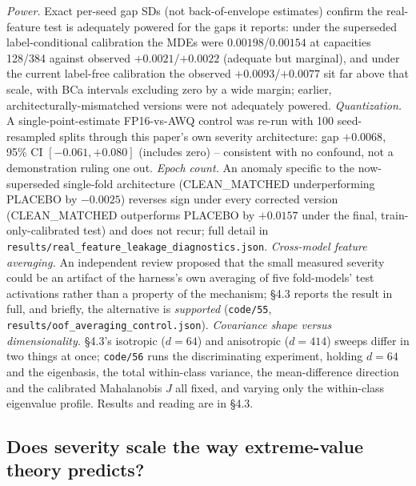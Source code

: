 \documentclass[10pt]{article} %
\begin{document}
\emph{Power.} Exact
per-seed gap SDs (not back-of-envelope estimates) confirm the real-feature
test is adequately powered for the gaps it reports: under the superseded
label-conditional calibration the MDEs were $0.00198$/$0.00154$ at capacities
128/384 against observed $+0.0021$/$+0.0022$ (adequate but marginal), and
under the current label-free calibration the observed $+0.0093$/$+0.0077$ sit
far above that scale, with BCa intervals excluding zero by a wide margin;
earlier, architecturally-mismatched versions were not adequately powered.
\emph{Quantization.} A single-point-estimate FP16-vs-AWQ control was re-run
with 100 seed-resampled splits through this paper's own severity
architecture: gap $+0.0068$, 95\% CI $[-0.061,+0.080]$ (includes zero) --
consistent with no confound, not a demonstration ruling one out. \emph{Epoch
count.} An anomaly specific to the now-superseded single-fold architecture
(CLEAN\_MATCHED underperforming PLACEBO by $-0.0025$) reverses sign under
every corrected version (CLEAN\_MATCHED outperforms PLACEBO by $+0.0157$
under the final, train-only-calibrated test) and does not recur; full detail
in \texttt{results/real\_feature\_leakage\_diagnostics.json}.
\emph{Cross-model feature averaging.} An independent review proposed that the
small measured severity could be an artifact of the harness's own averaging
of five fold-models' test activations rather than a property of the
mechanism; §4.3 reports the result in full, and briefly, the alternative is
\emph{supported} (\texttt{code/55},
\texttt{results/oof\_averaging\_control.json}). \emph{Covariance shape versus
dimensionality.} §4.3's isotropic ($d=64$) and anisotropic ($d=414$) sweeps
differ in two things at once; \texttt{code/56} runs the discriminating
experiment, holding $d=64$ and the eigenbasis, the total within-class
variance, the mean-difference direction and the calibrated Mahalanobis $J$ all
fixed, and varying only the within-class eigenvalue profile. Results and
reading are in §4.3.

\subsection{Does severity scale the way extreme-value theory predicts?}
\end{document}
